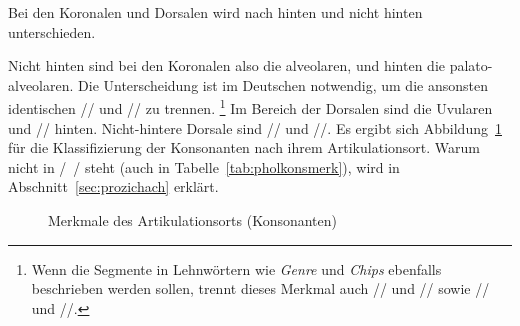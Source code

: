 \newpage




Bei den Koronalen und Dorsalen wird nach hinten und nicht hinten unterschieden.


Nicht hinten sind bei den Koronalen also die alveolaren, und hinten die palato-alveolaren.
Die Unterscheidung ist im Deutschen notwendig, um die ansonsten identischen // und // zu trennen.%
\footnote{Wenn die Segmente in Lehnwörtern wie \textit{Genre} und \textit{Chips} ebenfalls beschrieben werden sollen, trennt dieses Merkmal auch // und // sowie // und //.
}
Im Bereich der Dorsalen sind die Uvularen \textipa{[X]} und // hinten.
Nicht-hintere Dorsale sind \zB // und //.
Es ergibt sich Abbildung~\ref{fig:artort} für die Klassifizierung der Konsonanten nach ihrem Artikulationsort.
Warum \textipa{[X]} nicht in /~/ steht (auch in Tabelle~\ref{tab:pholkonsmerk}), wird in Abschnitt~\ref{sec:prozichach} erklärt.

\begin{figure}[!h]
  \caption{Merkmale des Artikulationsorts (Konsonanten)}
  \label{fig:artort}
\end{figure}

